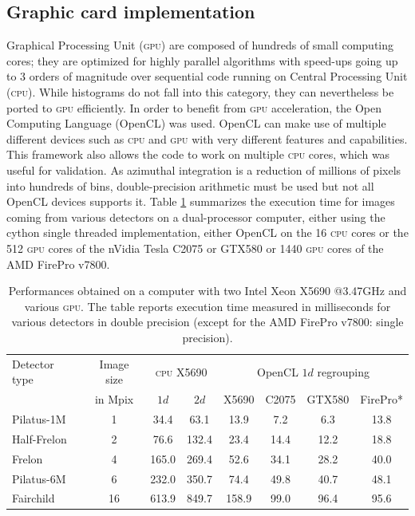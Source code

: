 \documentclass[a4paper]{jpconf}
\begin{document}
\subsection{Graphic card implementation}
Graphical Processing Unit (\textsc{gpu}) are composed of hundreds of
small computing cores; they are optimized for highly parallel algorithms
with speed-ups going up to 3 orders of magnitude over sequential code running
on Central Processing Unit (\textsc{cpu}).
While histograms do not fall into this category, they can  nevertheless be
ported to \textsc{gpu} efficiently. In order to benefit from \textsc{gpu} acceleration,
the Open Computing Language\cite{opencl} (OpenCL) was used. OpenCL can make use
of multiple different devices such as \textsc{cpu} and \textsc{gpu} with very
different features and capabilities.
This framework also allows the code to work on multiple \textsc{cpu} cores, which was
useful for validation. As azimuthal integration is a reduction
of millions of pixels into hundreds of bins, double-precision arithmetic must
be used but not all OpenCL devices supports it.
Table \ref{perfs} summarizes the execution time for images coming from
various detectors on a dual-processor computer, either using the
cython single threaded implementation, either OpenCL on the 16
\textsc{cpu} cores or the 512 \textsc{gpu} cores of the nVidia Tesla C2075 or
GTX580 or 1440 \textsc{gpu} cores of the AMD FirePro v7800.

\begin{table}[h]
\begin{center}
\caption{\label{perfs}Performances obtained on a computer with two Intel
Xeon X5690 @3.47GHz and various \textsc{gpu}.
 The table reports execution time measured in milliseconds for various detectors
 in double precision (except for the AMD FirePro v7800: single precision).}

\begin{tabular}{|l|c||c|c||c|c|c|c|}
\hline
Detector type   & Image size 	& \multicolumn{2}{|c||}{\textsc{cpu} X5690}& \multicolumn{4}{|c|}{OpenCL $1d$ regrouping} \\
					& in Mpix		& $1d$	&	$2d$	&	X5690	&	C2075	&	GTX580	&	FirePro* \\
\hline
Pilatus-1M 			& 1  			& 34.4  &	63.1	&	13.9	&	7.2		&	6.3		&	13.8 \\
Half-Frelon 		& 2  			& 76.6  &   132.4   &	23.4	&	14.4	&	12.2	&	18.8 \\
Frelon 				& 4  			& 165.0	&	269.4   &	52.6	&	34.1	&	28.2	&	40.0 \\
Pilatus-6M 			& 6  			& 232.0	&	350.7	&	74.4	&	49.8	&	40.7	&	48.1 \\
Fairchild 			& 16 			& 613.9	&	849.7   &	158.9	&	99.0	&	96.4	&	95.6 \\
\hline
\end{tabular}
\end{center}
\end{table}
\end{document}

